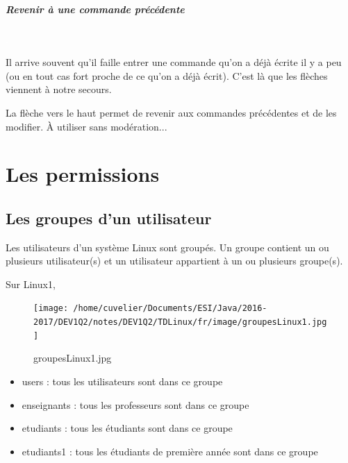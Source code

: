 \documentclass[11pt,a4paper]{article}
\begin{document}
			
		\subparagraph{Revenir \`a une commande pr\'ec\'edente} 
		
					\textcolor{white}{.} \par
				
            \par
          
          Il arrive souvent qu'il faille entrer une commande qu'on a d\'ej\`a \'ecrite il y a peu (ou en tout cas fort proche de ce qu'on a d\'ej\`a \'ecrit). 
          C'est l\`a que les fl\`eches viennent \`a notre secours.  
        
            \par
          
          La fl\`eche vers le haut permet de revenir aux commandes pr\'ec\'edentes et de les modifier. \`A utiliser sans mod\'eration...  
        
            \par
        \section{Les permissions}\subsection{Les groupes d'un utilisateur}
					Les utilisateurs d'un syst\`eme Linux sont group\'es. 
					Un groupe contient un ou plusieurs utilisateur(s) et un utilisateur appartient \`a un ou plusieurs groupe(s).
				
            \par
        
				  Sur Linux1, 
        
            \par
        \begin{figure}[hbt]
				    \begin{center}
					\texttt{[image: /home/cuvelier/Documents/ESI/Java/2016-2017/DEV1Q2/notes/DEV1Q2/TDLinux/fr/image/groupesLinux1.jpg]}
						\end{center}
                
                    \caption[groupesLinux1.jpg]{groupesLinux1.jpg}
                \end{figure}
                    
            \par
        
					\begin{itemize}
				
			\item users : tous les utilisateurs sont dans ce groupe
			\item enseignants : tous les professeurs sont dans ce groupe
			\item etudiants : tous les \'etudiants sont dans ce groupe
			\item etudiants1 : tous les \'etudiants de premi\`ere ann\'ee sont dans ce groupe
					\end{itemize}
				
\end{document}
